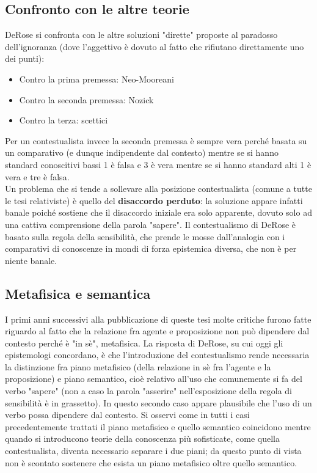 \documentclass[10pt,a4paper]{article}
\begin{document}
\subsection{Confronto con le altre teorie}
DeRose si confronta con le altre soluzioni "dirette" proposte al paradosso dell'ignoranza (dove l'aggettivo è dovuto al fatto che rifiutano direttamente uno dei punti): 
\begin{itemize}
	\item Contro la prima premessa: Neo-Mooreani
	\item Contro la seconda premessa: Nozick
	\item Contro la terza: scettici
\end{itemize}
Per un contestualista invece la seconda premessa è sempre vera perché basata su un comparativo (e dunque indipendente dal contesto) mentre se si hanno standard conoscitivi bassi 1 è falsa e 3 è vera mentre se si hanno standard alti 1 è vera e tre è falsa.\\
Un problema che si tende a sollevare alla posizione contestualista (comune a tutte le tesi relativiste) è quello del \textbf{disaccordo perduto}: la soluzione appare infatti banale poiché sostiene che il disaccordo iniziale era solo apparente, dovuto solo ad una cattiva comprensione della parola "sapere". Il contestualismo di DeRose è basato sulla regola della sensibilità, che prende le mosse dall'analogia con i comparativi di conoscenze in mondi di forza epistemica diversa, che non è per niente banale. 
\subsection{Metafisica e semantica}
I primi anni successivi alla pubblicazione di queste tesi molte critiche furono fatte riguardo al fatto che la relazione fra agente e proposizione non può dipendere dal contesto perché è "in sè", metafisica. La risposta di DeRose, su cui oggi gli epistemologi concordano, è che l'introduzione del contestualismo rende necessaria la distinzione fra piano metafisico (della relazione in sè fra l'agente e la proposizione) e piano semantico, cioè relativo all'uso che comunemente si fa del verbo "sapere" (non a caso la parola "asserire" nell'esposizione della regola di sensibilità è in grassetto). In questo secondo caso appare plausibile che l'uso di un verbo possa dipendere dal contesto. Si osservi come in tutti i casi precedentemente trattati il piano metafisico e quello semantico coincidono mentre quando si introducono teorie della conoscenza più sofisticate, come quella contestualista, diventa necessario separare i due piani; da questo punto di vista non è scontato sostenere che esista un piano metafisico oltre quello semantico.
\newpage
\end{document}
